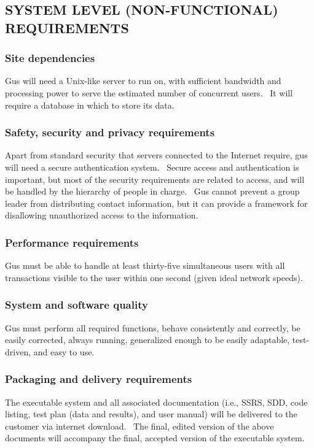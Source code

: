 \documentclass[letterpaper]{article}
\begin{document}
\subsection[SYSTEM LEVEL (NON{}-FUNCTIONAL) REQUIREMENTS]{\rmfamily
SYSTEM LEVEL (NON-FUNCTIONAL) REQUIREMENTS}
\subsubsection[Site dependencies]{\rmfamily Site dependencies}
{\color{black}
Gus will need a Unix-like server to run on, with sufficient bandwidth
and processing power to serve the estimated number of concurrent users.
\ It will require a database in which to store its data.}

\subsubsection[Safety, security and privacy requirements]{\rmfamily
Safety, security and privacy requirements}
{\color{black}
Apart from standard security that servers connected to the Internet
require, gus will need a secure authentication system. \ Secure access
and authentication is important, but most of the security requirements
are related to access, and will be handled by the hierarchy of people
in charge. \ Gus cannot prevent a group leader from distributing
contact information, but it can provide a framework for disallowing
unauthorized access to the information.}

\subsubsection[Performance requirements]{\rmfamily Performance
requirements}
{\color{black}
Gus must be able to handle at least thirty-five simultaneous users with
all transactions visible to the user within one second (given ideal
network speeds).}

\subsubsection[System and software quality]{\rmfamily System and
software quality}
{\color{black}
Gus must perform all required functions, behave consistently and
correctly, be easily corrected, always running, generalized enough to
be easily adaptable, test-driven, and easy to use.}

\subsubsection[Packaging and delivery requirements]{\rmfamily Packaging
and delivery requirements}
{\color{black}
The executable system and all associated documentation (i.e., SSRS, SDD,
code listing, test plan (data and results), and user manual) will be
delivered to the customer via internet download. \ The final, edited
version of the above documents will accompany the final, accepted
version of the executable system.}
\end{document}
